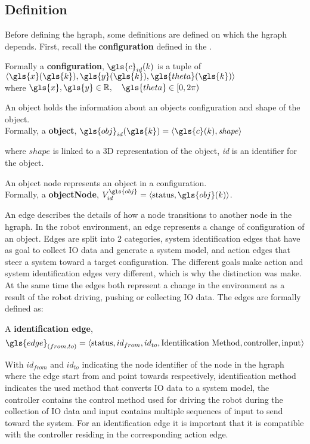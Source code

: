 \subsection{Definition}%
\label{subsec:hgraph_definition}%
Before defining the \ac{hgraph}, some definitions are defined on which the \ac{hgraph} depends. First, recall the \textbf{configuration} defined in the .\bs

Formally a \textbf{configuration}, $\gls{c}_{id}(k)$ is a tuple of $\left\langle \gls{x}(\gls{k}), \gls{y}(\gls{k}), \gls{theta}(\gls{k})\right\rangle$\\ where $\gls{x}, \gls{y} \in \mathbb{R}, \quad  \gls{theta} \in [0, 2\pi)$\bs

An object holds the information about an objects configuration and shape of the object.\\Formally, a \textbf{object},  $\gls{obj}_{id}(\gls{k}) = \left\langle \gls{c}(k), \mathit{shape} \right\rangle $\bs

where $\mathit{shape}$ is linked to a 3D representation of the object, \textit{id} is an identifier for the object.\bs

An object node represents an object in a configuration.\\Formally, a \textbf{objectNode}, $V^{\gls{obj}}_{id} =\left\langle \textrm{status}, \gls{obj}(k)\right\rangle $.\bs

An edge describes the details of how a node transitions to another node in the \ac{hgraph}. In the robot environment, an edge represents a change of configuration of an object. Edges are split into 2 categories, system identification edges that have as goal to collect \ac{IO} data and generate a system model, and action edges that steer a system toward a target configuration. The different goals make action and system identification edges very different, which is why the distinction was make. At the same time the edges both represent a change in the environment as a result of the robot driving, pushing or collecting \ac{IO} data. The edges are formally defined as:\bs

A \textbf{identification edge}, \[\gls{edge}_{(from, to)} = \left\langle \textrm{status}, id_{from}, id_{to}, \textrm{Identification Method}, \textrm{controller}, \textrm{input}\right\rangle\]\bs

With $id_{from}$ and $id_{to}$ indicating the node identifier of the node in the \ac{hgraph} where the edge start from and point towards respectively, identification method indicates the used method that converts \ac{IO} data to a system model, the controller contains the control method used for driving the robot during the collection of \ac{IO} data and input contains multiple sequences of input to send toward the system. For an identification edge it is important that it is compatible with the controller residing in the corresponding action edge.\bs

